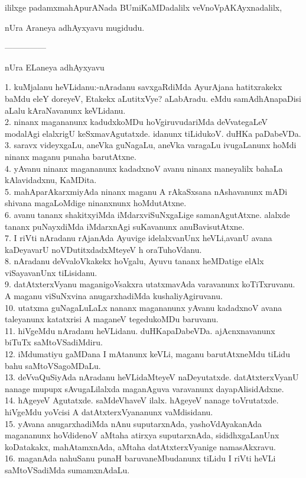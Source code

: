 \documentclass{article}
\begin{document}
\begin{center}
ililxge padamxmahApurANada BUmiKaMDadalilx veVnoVpAKAyxnadalilx,
\end{center}

\begin{center}
nUra Araneya adhAyxyavu mugidudu.
\end{center}

\begin{center}
---------------
\end{center}

\begin{center}
nUra ELaneya adhAyxyavu
\end{center}

1. kuMjalanu heVLidanu:-nAradanu savxgaRdiMda AyurAjana hatitxrakekx baMdu eleY doreyeV, Etakekx aLutitxVye? aLabAradu. eMdu samAdhAnapaDisi aLalu kAraNavanunx keVLidanu.\\
2. ninanx magananunx kadudxkoMDu hoVgiruvudariMda deVvategaLeV modalAgi elalxrigU keSxmavAgutatxde. idanunx tiLidukoV. duHKa paDabeVDa.\\
3. saravx videyxgaLu, aneVka guNagaLu, aneVka varagaLu ivugaLanunx hoMdi ninanx maganu punaha barutAtxne.\\
4. yAvanu ninanx magananunx kadadxnoV avanu ninanx maneyalilx bahaLa kAlavidadxnu, KaMDita.\\
5. mahAparAkarxmiyAda ninanx maganu A rAkaSxsana nAshavanunx mADi shivana magaLoMdige ninanxnunx hoMdutAtxne.\\
6. avanu tananx shakitxyiMda iMdarxviSuNxgaLige samanAgutAtxne. alalxde tananx puNayxdiMda iMdarxnAgi suKavanunx anuBavisutAtxne.\\
7. I riVti nAradanu rAjanAda Ayuvige idelalxvanUnx heVLi,avanU avana kaDeyavarU noVDutitxdadxMteyeV h oraTuhoVdanu.\\
8. nAradanu deVvaloVkakekx hoVgalu, Ayuvu tananx heMDatige elAlx viSayavanUnx tiLisidanu.\\
9. datAtxterxVyanu maganigoVsakxra utatxmavAda varavanunx koTiTxruvanu. A maganu viSuNxvina anugarxhadiMda kushaliyAgiruvanu.\\
10. utatxma guNagaLuLaLx nananx magananunx yAvanu kadadxnoV avana taleyanunx katatxrisi A maganeV tegedukoMDu baruvanu.\\
11. hiVgeMdu nAradanu heVLidanu. duHKapaDabeVDa. ajAcnxnavanunx biTuTx saMtoVSadiMdiru.\\
12. iMdumatiyu gaMDana I mAtanunx keVLi, maganu barutAtxneMdu tiLidu bahu saMtoVSagoMDaLu.\\
13. deVvaQuSiyAda nAradanu heVLidaMteyeV naDeyutatxde. datAtxterxVyanU nanage mupupx sAvugaLilalxda maganAguva varavanunx dayapAlisidAdxne.\\
14. hAgeyeV Agutatxde. saMdeVhaveV ilalx. hAgeyeV nanage toVrutatxde. hiVgeMdu yoVcisi A datAtxterxVyananunx vaMdisidanu.\\
15. yAvana anugarxhadiMda nAnu suputarxnAda, yashoVdAyakanAda magananunx hoVdidenoV aMtaha atirxya suputarxnAda, sididhxgaLanUnx koDatakakx, mahAtamxnAda, aMtaha datAtxterxVyanige namasAkxravu.\\
16. maganAda nahuSanu punaH baruvaneMbudanunx tiLidu I riVti heVLi saMtoVSadiMda sumamxnAdaLu.
\end{document}
